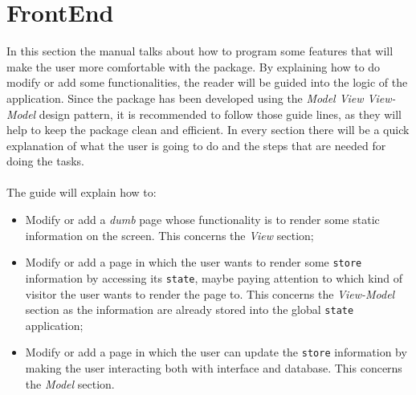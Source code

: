 \section{FrontEnd}
In this section the manual talks about how to program some features that will make the user more comfortable with the package. By explaining how to do modify or add some functionalities, the reader will be guided into the logic of the application.
Since the package has been developed using the \emph{Model View View-Model} design pattern, it is recommended to follow those guide lines, as they will help to keep the package clean and efficient. In every section there will be a quick explanation of what the user is going to do and the steps that are needed for doing the tasks.
~\\~\\The guide will explain how to:
\begin{itemize}
	\item Modify or add a \textit{dumb} page whose functionality is to render some static information on the screen. This concerns the \emph{View} section;
	\item Modify or add a page in which the user wants to render some \verb|store| information by accessing its \verb|state|, maybe paying attention to which kind of visitor the user wants to render the page to. This concerns the \emph{View-Model} section as the information are already stored into the global \verb|state| application;
	\item Modify or add a page in which the user can update the \verb|store| information by making the user interacting both with interface and database. This concerns the \emph{Model} section.
\end{itemize}

